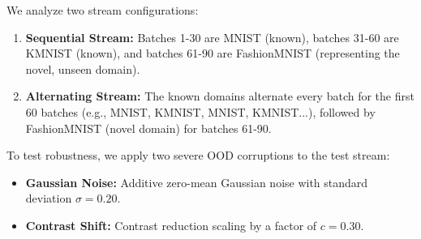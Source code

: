 \documentclass{article}
\theoremstyle{plain}
\theoremstyle{definition}
\theoremstyle{remark}
\begin{document}
We analyze two stream configurations:
\begin{enumerate}
    \item \textbf{Sequential Stream:} Batches 1-30 are MNIST (known), batches 31-60 are KMNIST (known), and batches 61-90 are FashionMNIST (representing the novel, unseen domain).
    \item \textbf{Alternating Stream:} The known domains alternate every batch for the first 60 batches (e.g., MNIST, KMNIST, MNIST, KMNIST...), followed by FashionMNIST (novel domain) for batches 61-90.
\end{enumerate}

To test robustness, we apply two severe OOD corruptions to the test stream:
\begin{itemize}
    \item \textbf{Gaussian Noise:} Additive zero-mean Gaussian noise with standard deviation $\sigma = 0.20$.
    \item \textbf{Contrast Shift:} Contrast reduction scaling by a factor of $c = 0.30$.
\end{itemize}
\end{document}
